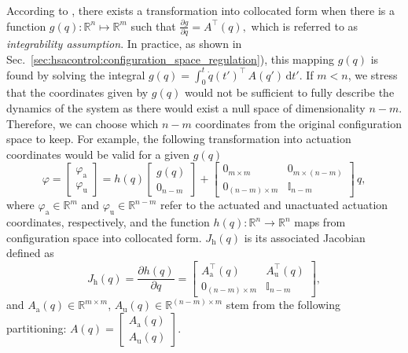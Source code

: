 According to \citet{pustina2024input}, there exists a transformation into collocated form when there is a function $g(q): \mathbb{R}^n \mapsto \mathbb{R}^m$ such that $\frac{\partial g}{\partial q} = A^\top (q),$
which is referred to as \emph{integrability assumption}. In practice, as shown in Sec.~\ref{sec:hsacontrol:configuration_space_regulation}), this mapping $g(q)$ is found by solving the integral $g(q) = \int_0^t \dot{q}(t')^\top \, A(q') \, \mathrm{d} t'$.
If $m < n$, we stress that the coordinates given by $g(q)$ would not be sufficient to fully describe the dynamics of the system as there would exist a null space of dimensionality $n - m$. Therefore, we can choose which  $n-m$ coordinates from the original configuration space to keep. For example, the following transformation into actuation coordinates would be valid for a given $g(q)$~\citep{pustina2024input}
\begin{equation}
    \varphi = \begin{bmatrix}
        \varphi_\mathrm{a}\\ \varphi_\mathrm{u}
    \end{bmatrix} = h(q) \begin{bmatrix}
        g(q)\\ 0_{n-m}
    \end{bmatrix} + \begin{bmatrix}
        0_{m \times m} & 0_{m \times (n-m)}\\
        0_{(n-m) \times m} & \mathbb{I}_{n-m}
    \end{bmatrix} \, q,
\end{equation}
where $\varphi_\mathrm{a} \in \mathbb{R}^m$ and $\varphi_\mathrm{u} \in \mathbb{R}^{n-m}$ refer to the actuated and unactuated actuation coordinates, respectively, and the function $h(q): \mathbb{R}^{n} \to \mathbb{R}^n$ maps from configuration space into collocated form. $J_\mathrm{h}(q)$ is its associated Jacobian defined as
\begin{equation}
    J_\mathrm{h}(q) = \frac{\partial h(q)}{\partial q} = \begin{bmatrix}
        A_\mathrm{a}^\top(q) & A_\mathrm{u}^\top(q)\\
        0_{(n-m) \times m} & \mathbb{I}_{n-m}
    \end{bmatrix},
\end{equation}
and $A_\mathrm{a}(q) \in \mathbb{R}^{m \times m}$, $A_\mathrm{u}(q) \in \mathbb{R}^{(n-m) \times m}$ stem from the following partitioning: $A(q) = \begin{bmatrix}
    A_\mathrm{a}(q)\\ A_\mathrm{u}(q)
\end{bmatrix}$.
